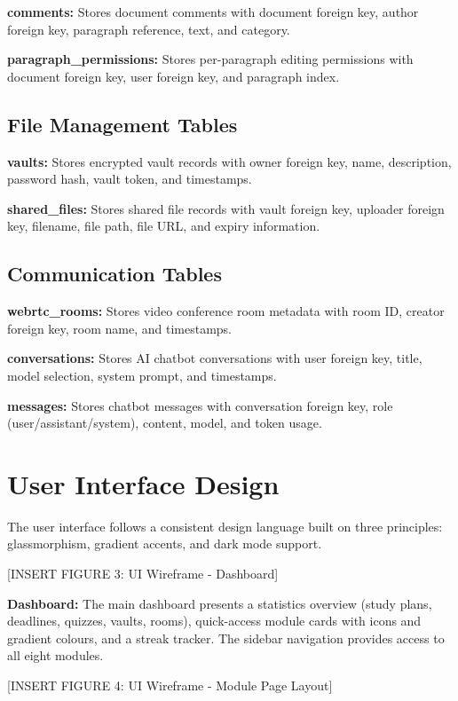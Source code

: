 \documentclass[12pt,a4paper]{report}
\begin{document}
\textbf{comments:} Stores document comments with document foreign key, author foreign key, paragraph reference, text, and category.

\textbf{paragraph\_permissions:} Stores per-paragraph editing permissions with document foreign key, user foreign key, and paragraph index.

\subsection{File Management Tables}

\textbf{vaults:} Stores encrypted vault records with owner foreign key, name, description, password hash, vault token, and timestamps.

\textbf{shared\_files:} Stores shared file records with vault foreign key, uploader foreign key, filename, file path, file URL, and expiry information.

\subsection{Communication Tables}

\textbf{webrtc\_rooms:} Stores video conference room metadata with room ID, creator foreign key, room name, and timestamps.

\textbf{conversations:} Stores AI chatbot conversations with user foreign key, title, model selection, system prompt, and timestamps.

\textbf{messages:} Stores chatbot messages with conversation foreign key, role (user/assistant/system), content, model, and token usage.

\section{User Interface Design}

The user interface follows a consistent design language built on three principles: glassmorphism, gradient accents, and dark mode support.

[INSERT FIGURE 3: UI Wireframe - Dashboard]

\textbf{Dashboard:} The main dashboard presents a statistics overview (study plans, deadlines, quizzes, vaults, rooms), quick-access module cards with icons and gradient colours, and a streak tracker. The sidebar navigation provides access to all eight modules.

[INSERT FIGURE 4: UI Wireframe - Module Page Layout]
\end{document}
